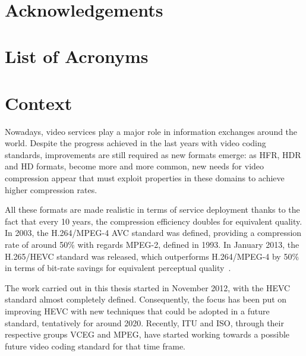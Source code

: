 \documentclass[11pt,a4paper,openright,twoside]{book}
\title{\Huge\bf\mytitle}
\author{\myauthor}
\numberwithin{equation}{section} %
\numberwithin{figure}{section} %
\numberwithin{table}{section} %
\begin{document}
\frontmatter
\maketitle

\chapter*{Acknowledgements}
\label{cha:acknowledgements}

\tableofcontents
{}
\cleardoublepage
\chapter*{List of Acronyms}
\label{cha:glossary}

\cleardoublepage
\listoffigures
\cleardoublepage
\listoftables
\cleardoublepage

\mainmatter

\chapter*{Context}
\label{cha:context}

Nowadays, video services play a major role in information exchanges around the
world.
Despite the progress achieved in the last years with video coding standards,
improvements are still required as new formats emerge:
as \ac{HFR}, \ac{HDR} and \ac{HD} formats, become more and more common, new
needs for video compression appear that must exploit properties in these
domains to achieve higher compression rates.

All these formats are made realistic in terms of service deployment thanks to
the fact that every 10 years, the compression efficiency doubles for
equivalent quality.
In 2003, the H.264/\acs{MPEG}-4 \acs{AVC} standard was defined, providing
a compression rate of around 50\% with regards \acs{MPEG}-2, defined
in 1993.
In January 2013, the H.265/\acs{HEVC} standard was released, which
outperforms H.264/\acs{MPEG}-4 by 50\% in terms of bit-rate savings for
equivalent perceptual quality~\cite{sullivan-12-overview-hevc}.

\bigskip

The work carried out in this thesis started in November 2012, with the
\acs{HEVC} standard almost completely defined.
Consequently, the focus has been put on improving \acs{HEVC} with
new techniques that could be adopted in a future standard, tentatively for
around 2020.
Recently, \acs{ITU} and \acs{ISO}, through their respective groups \acs{VCEG}
and \acs{MPEG}, have started working towards a possible future video coding
standard for that time frame.
\end{document}
